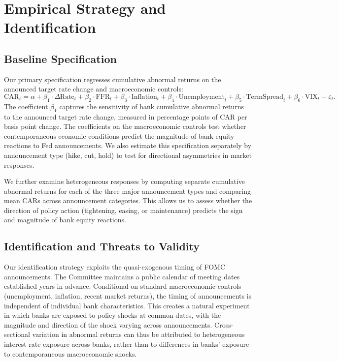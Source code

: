 \documentclass{article}
\begin{document}
\section{Empirical Strategy and Identification}

\subsection{Baseline Specification}

Our primary specification regresses cumulative abnormal returns on the announced target rate change and macroeconomic controls:
\begin{equation}
\mathrm{CAR}_{t} = \alpha + \beta_1 \cdot \Delta \text{Rate}_{t} + \beta_2 \cdot \text{FFR}_{t} + \beta_3 \cdot \text{Inflation}_{t} + \beta_4 \cdot \text{Unemployment}_{t} + \beta_5 \cdot \text{TermSpread}_{t} + \beta_6 \cdot \text{VIX}_{t} + \varepsilon_t.
\end{equation}
The coefficient $\beta_1$ captures the sensitivity of bank cumulative abnormal returns to the announced target rate change, measured in percentage points of CAR per basis point change. The coefficients on the macroeconomic controls test whether contemporaneous economic conditions predict the magnitude of bank equity reactions to Fed announcements. We also estimate this specification separately by announcement type (hike, cut, hold) to test for directional asymmetries in market responses.

We further examine heterogeneous responses by computing separate cumulative abnormal returns for each of the three major announcement types and comparing mean CARs across announcement categories. This allows us to assess whether the direction of policy action (tightening, easing, or maintenance) predicts the sign and magnitude of bank equity reactions.

\subsection{Identification and Threats to Validity}

Our identification strategy exploits the quasi-exogenous timing of FOMC announcements. The Committee maintains a public calendar of meeting dates established years in advance. Conditional on standard macroeconomic controls (unemployment, inflation, recent market returns), the timing of announcements is independent of individual bank characteristics. This creates a natural experiment in which banks are exposed to policy shocks at common dates, with the magnitude and direction of the shock varying across announcements. Cross-sectional variation in abnormal returns can thus be attributed to heterogeneous interest rate exposure across banks, rather than to differences in banks' exposure to contemporaneous macroeconomic shocks.
\end{document}
